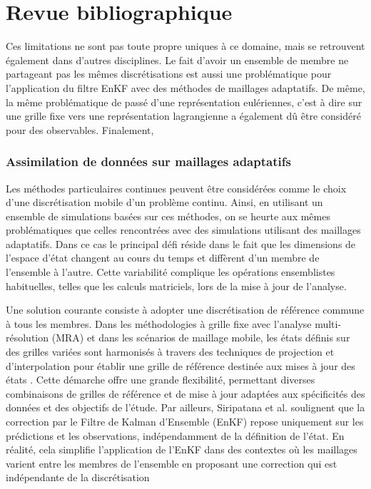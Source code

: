 \section{Revue bibliographique}

Ces limitations ne sont pas toute propre uniques à ce domaine, mais se retrouvent également dans d'autres disciplines. Le fait d'avoir un ensemble de membre ne partageant pas les mêmes discrétisations est aussi une problématique pour l'application du filtre EnKF avec des méthodes de maillages adaptatifs. De même, la même problématique de passé d'une représentation eulériennes, c'est à dire sur une grille fixe vers une représentation lagrangienne a également dû être considéré pour des observables. Finalement,

\subsubsection{Assimilation de données sur maillages adaptatifs}

Les méthodes particulaires continues peuvent être considérées comme le choix d'une discrétisation mobile d'un problème continu. Ainsi, en utilisant un ensemble de simulations basées sur ces méthodes, on se heurte aux mêmes problématiques que celles rencontrées avec des simulations utilisant des maillages adaptatifs.
Dans ce cas le principal défi réside dans le fait que les dimensions de l'espace d'état changent au cours du temps et diffèrent d'un membre de l'ensemble à l'autre. Cette variabilité complique les opérations ensemblistes habituelles, telles que les calculs matriciels, lors de la mise à jour de l'analyse.

Une solution courante consiste à adopter une discrétisation de référence commune à tous les membres. Dans les méthodologies à grille fixe avec l'analyse multi-résolution (MRA) et dans les scénarios de maillage mobile, les états définis sur des grilles variées sont harmonisés à travers des techniques de projection et d'interpolation pour établir une grille de référence destinée aux mises à jour des états \cite{siripatana_combining_2019, bonan_data_2017}. Cette démarche offre une grande flexibilité, permettant diverses combinaisons de grilles de référence et de mise à jour adaptées aux spécificités des données et des objectifs de l'étude. Par ailleurs, Siripatana et al. \cite{siripatana_combining_2019} soulignent que la correction par le Filtre de Kalman d’Ensemble (EnKF) repose uniquement sur les prédictions et les observations, indépendamment de la définition de l'état. En réalité, cela simplifie l'application de l'EnKF dans des contextes où les maillages varient entre les membres de l'ensemble en proposant une correction qui est indépendante de la discrétisation

